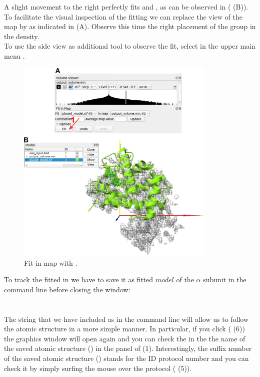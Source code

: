   A slight movement to the right perfectly fits  and , as can be observed in ( (B)). To facilitate the visual inspection of the fitting we can replace the  view of the map by  as indicated in (A). Observe this time the right placement of the  group in the  density.\\
  To use the side view as additional tool to observe the fit, select in the upper main menu .
  
  \begin{figure}[H]
  \centering 
  \captionsetup{width=.7\linewidth} 
  \includegraphics[width=0.85\textwidth]{Images/Fig22}
  \caption{Fit in map with \chimera.}
  \label{fig:chimera_fit_in_map}
  \end{figure}
  
  To track the \chimera fitted  in \scipion we have to save it as fitted $model$ of the  $\alpha$ subunit in the \chimera command line before closing the \chimera window:\\
  \\
  \\
  
  The string that we have included as  in the command line will allow us to follow the atomic structure in a more simple manner. In particular, if you click  ( (6)) the \chimera graphics window will open again and you can check the  in the the name of the saved atomic structure () in the  panel of  (1). Interestingly, the suffix number of the saved atomic structure () stands for the ID protocol number and you can check it by simply surfing the mouse over the protocol ( (5)).
  
